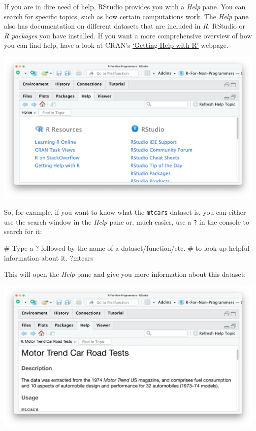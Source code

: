 \documentclass[
  letterpaper,
  DIV=11,
  numbers=noendperiod]{scrreprt}
\newenvironment{Shaded}{\begin{snugshade}}{\end{snugshade}}
\newcommand{\CommentTok}[1]{\textcolor[rgb]{0.37,0.37,0.37}{#1}}
\newcommand{\NormalTok}[1]{\textcolor[rgb]{0.00,0.23,0.31}{#1}}
\begin{document}
If you are in dire need of help, RStudio provides you with a \emph{Help}
pane. You can search for specific topics, such as how certain
computations work. The \emph{Help} pane also has documentation on
different datasets that are included in \emph{R}, RStudio or \emph{R
packages} you have installed. If you want a more comprehensive overview
of how you can find help, have a look at CRAN's
\href{https://www.r-project.org/help.html}{`Getting Help with R'}
webpage.

\includegraphics{images/chapter_04_img/05_files_plots_etc/04_rstudio_help.png}

So, for example, if you want to know what the \texttt{mtcars} dataset
is, you can either use the search window in the \emph{Help} pane or,
much easier, use a \texttt{?} in the console to search for it:

\begin{Shaded}
\begin{Highlighting}[]
\CommentTok{\# Type a \textquotesingle{}?\textquotesingle{} followed by the name of a dataset/function/etc.}
\CommentTok{\# to look up helpful information about it.}
\NormalTok{?mtcars}
\end{Highlighting}
\end{Shaded}

This will open the \emph{Help} pane and give you more information about
this dataset:

\includegraphics{images/chapter_04_img/05_files_plots_etc/04_rstudio_help_mtcars.png}
\end{document}
